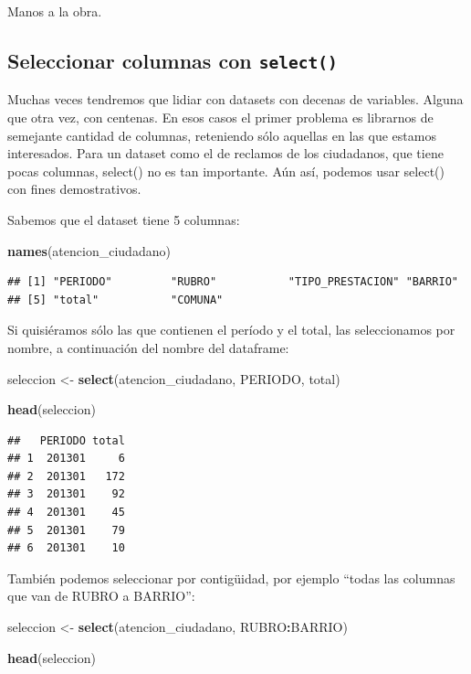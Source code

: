 \documentclass[]{book}
\newenvironment{Shaded}{\begin{snugshade}}{\end{snugshade}}
\newcommand{\KeywordTok}[1]{\textcolor[rgb]{0.13,0.29,0.53}{\textbf{#1}}}
\newcommand{\StringTok}[1]{\textcolor[rgb]{0.31,0.60,0.02}{#1}}
\newcommand{\OperatorTok}[1]{\textcolor[rgb]{0.81,0.36,0.00}{\textbf{#1}}}
\newcommand{\NormalTok}[1]{#1}
\begin{document}
Manos a la obra.

\subsection{\texorpdfstring{Seleccionar columnas con
\texttt{select()}}{Seleccionar columnas con select()}}\label{seleccionar-columnas-con-select}

Muchas veces tendremos que lidiar con datasets con decenas de variables.
Alguna que otra vez, con centenas. En esos casos el primer problema es
librarnos de semejante cantidad de columnas, reteniendo sólo aquellas en
las que estamos interesados. Para un dataset como el de reclamos de los
ciudadanos, que tiene pocas columnas, select() no es tan importante. Aún
así, podemos usar select() con fines demostrativos.

Sabemos que el dataset tiene 5 columnas:

\begin{Shaded}
\begin{Highlighting}[]
\KeywordTok{names}\NormalTok{(atencion_ciudadano)}
\end{Highlighting}
\end{Shaded}

\begin{verbatim}
## [1] "PERIODO"         "RUBRO"           "TIPO_PRESTACION" "BARRIO"         
## [5] "total"           "COMUNA"
\end{verbatim}

Si quisiéramos sólo las que contienen el período y el total, las
seleccionamos por nombre, a continuación del nombre del dataframe:

\begin{Shaded}
\begin{Highlighting}[]
\NormalTok{seleccion <-}\StringTok{ }\KeywordTok{select}\NormalTok{(atencion_ciudadano, PERIODO, total)}

\KeywordTok{head}\NormalTok{(seleccion)}
\end{Highlighting}
\end{Shaded}

\begin{verbatim}
##   PERIODO total
## 1  201301     6
## 2  201301   172
## 3  201301    92
## 4  201301    45
## 5  201301    79
## 6  201301    10
\end{verbatim}

También podemos seleccionar por contigüidad, por ejemplo ``todas las
columnas que van de RUBRO a BARRIO'':

\begin{Shaded}
\begin{Highlighting}[]
\NormalTok{seleccion <-}\StringTok{ }\KeywordTok{select}\NormalTok{(atencion_ciudadano, RUBRO}\OperatorTok{:}\NormalTok{BARRIO)}

\KeywordTok{head}\NormalTok{(seleccion)}
\end{Highlighting}
\end{Shaded}
\end{document}
